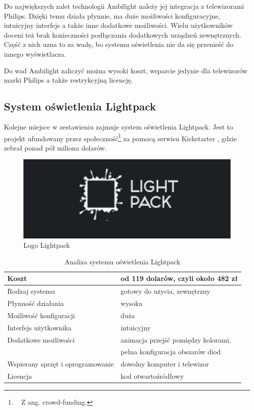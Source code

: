 \documentclass[12pt]{report}
\begin{document}
Do największych zalet technologii Ambilight należy jej integracja z telewizorami Philips. Dzięki temu działa płynnie, ma duże możliwości konfiguracyjne, intuicyjny interfejs a także inne dodatkowe możliwości. Wielu użytkowników doceni też brak konieczności podłączania dodatkowych urządzeń zewnętrznych. Część z nich uzna to za wadę, bo systemu oświetlenia nie da się przenieść do innego wyświetlacza.

Do wad Ambilight zaliczyć można wysoki koszt, wsparcie jedynie dla telewizorów marki Philips a także restrykcyjną licencję.


\subsection{System oświetlenia Lightpack} \label{lightpack}

Kolejne miejsce w zestawieniu zajmuje system oświetlenia Lightpack. Jest to projekt ufundowany przez społeczność\footnote{~ Z ang. crowd-funding.} za pomocą serwisu Kickstarter \cite{lpk}, gdzie zebrał ponad pół miliona dolarów.

\begin{figure}[h]
\centering
\includegraphics[width=.7\textwidth]{../resources/lightpack.png}
\caption[Logo Lightpack]{Logo Lightpack \cite{lps}}
\end{figure}

\begin{table}[h]
\centering
\begin{tabular}{| l | l |} 
\hline 
Koszt & od 119 dolarów, czyli około 482 zł \\ \hline
Rodzaj systemu & gotowy do użycia, zewnętrzny \\ \hline
Płynność działania & wysoka \\ \hline
Możliwość konfiguracji & duża  \\ \hline
Interfejs użytkownika & intuicyjny  \\ \hline
Dodatkowe możliwości &  animacja przejść pomiędzy kolorami, \\ \hline
& pełna konfiguracja obszarów diod \\ \hline
Wspierany sprzęt i oprogramowanie &  dowolny komputer i telewizor   \\ \hline
Licencja & kod otwartoźródłowy  \\ \hline
\end{tabular} 
\caption{Analiza systemu oświetlenia Lightpack}
\end{table}
\end{document}
